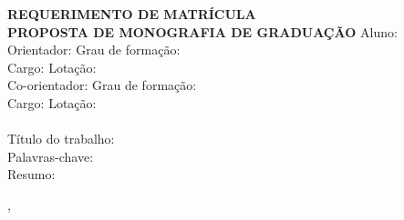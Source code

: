 \documentclass[a4paper]{paper}
\begin{document}
	
	{\center \Large \bf REQUERIMENTO DE MATRÍCULA\\ 
		PROPOSTA DE MONOGRAFIA DE GRADUAÇÃO
	}
	Aluno: \dotuline{\student} \dotfill \\
	Orientador: \dotuline{\advisorName} \dotfill Grau de formação:  \dotuline{\advisorDegree} \dotfill  \\
	Cargo: \dotuline{\advisorPosition}\dotfill Lotação: \dotuline{\advisorLotacao}\dotfill \\
	Co-orientador: \dotuline{\coadvisorName} \dotfill Grau de formação:  \dotuline{\coadvisorDegree} \dotfill  \\
	Cargo: \dotuline{\coadvisorPosition}\dotfill Lotação: \dotuline{\coadvisorLotacao}\dotfill
	\\
	\\
	Título do trabalho: \dotuline{\thesisTitle}\dotfill \\
	Palavras-chave: \dotuline{\thesisKeywords} \dotfill \\
	Resumo: \dotuline{\thesisResume} \dotfill
	\dotcolumnfill
	
	\local, \dateRequirement
	
\end{document}
